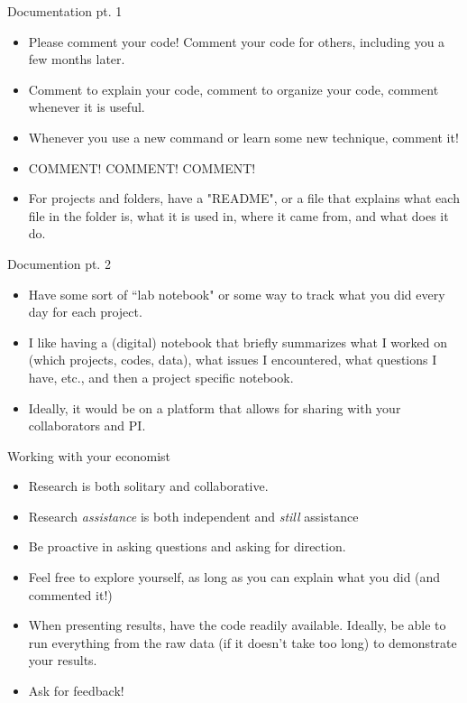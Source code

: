 \documentclass{beamer}
\begin{document}
\begin{frame}{Documentation pt. 1}
    \begin{itemize}
        \item Please comment your code! Comment your code for others, including you a few months later. 
        \item Comment to explain your code, comment to organize your code, comment whenever it is useful. 
        \item Whenever you use a new command or learn some new technique, comment it!
        \item COMMENT! COMMENT! COMMENT!
        \item For projects and folders, have a "README", or a file that explains what each file in the folder is, what it is used in, where it came from, and what does it do. 
    \end{itemize}
\end{frame}

\begin{frame}{Documention pt. 2}
    \begin{itemize}
        \item Have some sort of ``lab notebook" or some way to track what you did every day for each project. 
        \item I like having a (digital) notebook that briefly summarizes what I worked on (which projects, codes, data), what issues I encountered, what questions I have, etc., and then a project specific notebook. 
        \item Ideally, it would be on a platform that allows for sharing with your collaborators and PI. 
    \end{itemize}
\end{frame}

\begin{frame}{Working with your economist}
\begin{itemize}
    \item Research is both solitary and collaborative.
    \item Research \textit{assistance} is both independent and \textit{still} assistance
    \item Be proactive in asking questions and asking for direction. 
    \item Feel free to explore yourself, as long as you can explain what you did (and commented it!)
    \item When presenting results, have the code readily available. Ideally, be able to run everything from the raw data (if it doesn't take too long) to demonstrate your results. 
    \item Ask for feedback!
\end{itemize}
\end{frame}
\end{document}
